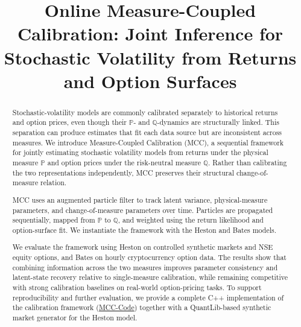 \documentclass[sigconf,anonymous,review]{acmart}
\begin{document}
\title{Online Measure-Coupled Calibration: Joint Inference for Stochastic Volatility from Returns and Option Surfaces}

\begin{abstract}
Stochastic-volatility models are commonly calibrated separately to
historical returns and option prices, even though their \(\mathbb{P}\)- and \(\mathbb{Q}\)-dynamics are structurally linked. This separation can produce estimates that fit each data source but are inconsistent across measures.
We introduce Measure-Coupled Calibration (MCC), a sequential framework
for jointly estimating stochastic volatility models from returns under
the physical measure \(\mathbb{P}\) and option prices under the
risk-neutral measure \(\mathbb{Q}\). Rather than calibrating the two
representations independently, MCC preserves their structural
change-of-measure relation. 

MCC uses an augmented particle filter to track latent variance,
physical-measure parameters, and change-of-measure parameters over
time. Particles are propagated sequentially, mapped from
\(\mathbb{P}\) to \(\mathbb{Q}\), and weighted using the return
likelihood and option-surface fit. We instantiate the framework with
the Heston and Bates models.

We evaluate the framework using Heston on controlled synthetic markets and NSE equity options, and Bates on hourly cryptocurrency option data. The results show that combining information across the two measures improves parameter consistency and latent-state recovery relative to single-measure calibration, while remaining competitive with strong calibration baselines on real-world option-pricing tasks. To support reproducibility and further evaluation, we provide a complete C++ implementation of the calibration framework (\href{https://anonymous.4open.science/r/Measure_Coupled_Calibration/}{MCC-Code}) together with a QuantLib-based synthetic market generator for the Heston model.


\end{abstract}


\maketitle
\end{document}

